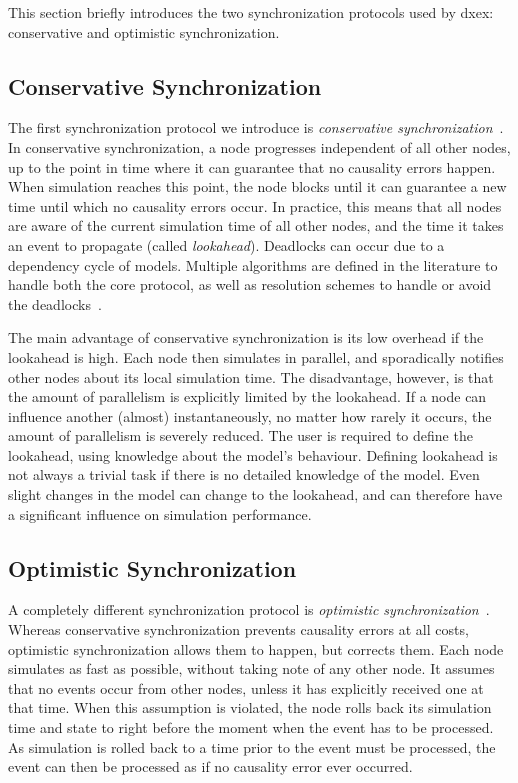 This section briefly introduces the two synchronization protocols used by dxex: conservative and optimistic synchronization.

\subsection{Conservative Synchronization}
The first synchronization protocol we introduce is \textit{conservative synchronization}~\cite{FujimotoBook}.
In conservative synchronization, a node progresses independent of all other nodes, up to the point in time where it can guarantee that no causality errors happen.
When simulation reaches this point, the node blocks until it can guarantee a new time until which no causality errors occur.
In practice, this means that all nodes are aware of the current simulation time of all other nodes, and the time it takes an event to propagate (called \textit{lookahead}).
Deadlocks can occur due to a dependency cycle of models.
Multiple algorithms are defined in the literature to handle both the core protocol, as well as resolution schemes to handle or avoid the deadlocks~\cite{FujimotoBook}.

The main advantage of conservative synchronization is its low overhead if the lookahead is high.
Each node then simulates in parallel, and sporadically notifies other nodes about its local simulation time.
The disadvantage, however, is that the amount of parallelism is explicitly limited by the lookahead.
If a node can influence another (almost) instantaneously, no matter how rarely it occurs, the amount of parallelism is severely reduced.
The user is required to define the lookahead, using knowledge about the model's behaviour.
Defining lookahead is not always a trivial task if there is no detailed knowledge of the model.
Even slight changes in the model can change to the lookahead, and can therefore have a significant influence on simulation performance.

\subsection{Optimistic Synchronization}
A completely different synchronization protocol is \textit{optimistic synchronization}~\cite{TimeWarp}.
Whereas conservative synchronization prevents causality errors at all costs, optimistic synchronization allows them to happen, but corrects them.
Each node simulates as fast as possible, without taking note of any other node.
It assumes that no events occur from other nodes, unless it has explicitly received one at that time.
When this assumption is violated, the node rolls back its simulation time and state to right before the moment when the event has to be processed.
As simulation is rolled back to a time prior to the event must be processed, the event can then be processed as if no causality error ever occurred.

